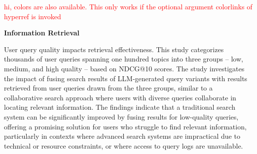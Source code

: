 \documentclass{seminar}
\begin{document}

\begin{slide}
\textcolor{red}{hi, colors are also available. This only works if the
optional argument colorlinks of hyperref is invoked}
\end{slide}

\begin{slide}
\textbf{Information Retrieval}

User query quality impacts retrieval effectiveness. This study categorizes
thousands of user queries spanning one hundred topics into three groups -- low,
medium, and high quality -- based on NDCG@10 scores.
The study investigates the impact of fusing search results of
\ac{LLM}-generated query variants with results retrieved from user queries
drawn from the three groups, similar to a collaborative search approach where
users with diverse queries collaborate in locating relevant information. 
The findings indicate that a traditional search system can be significantly
improved by fusing results for low-quality queries, 
offering a promising solution for users who struggle to find relevant
information, particularly in contexts where advanced search systems are
impractical due to technical or resource constraints, or where access to query
logs are unavailable.
\end{slide}
\end{document}

